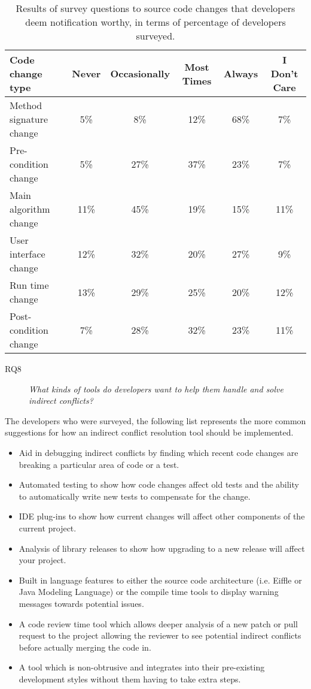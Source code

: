 \documentclass[conference]{IEEEtran}
\begin{document}
\begin{table*}[tb!]
\begin{center}
\begin{tabular}{| p{7cm} | c | c | c | c | c |}
\hline
Code change type &Never  & Occasionally & Most Times & Always & I Don't Care \\
\hline
\hline
Method signature change & 5\% & 8\% & 12\% & 68\% & 7\% \\ \hline
Pre-condition change & 5\% & 27\% & 37\% & 23\% & 7\% \\ \hline
Main algorithm change & 11\% & 45\% & 19\% & 15\% & 11\% \\ \hline
User interface change & 12\% & 32\% & 20\% & 27\% & 9\% \\ \hline
Run time change & 13\% & 29\% & 25\% & 20\% & 12\% \\ \hline
Post-condition change & 7\% & 28\% & 32\% & 23\% & 11\% \\ \hline
\end{tabular}
\end{center}
\caption{Results of survey questions to source code changes that developers deem notification worthy, in terms of percentage
of developers surveyed.\label{tab:pre}}
\end{table*}

\begin{description}
	\item[RQ8] \textit{What kinds of tools do developers want to help them handle and solve indirect conflicts?}
\end{description}

The developers who were surveyed, the following list represents the more common suggestions for how an indirect conflict
resolution tool should be implemented.

\begin{itemize}
	\item Aid in debugging indirect conflicts by finding which recent code changes are breaking a particular area of code or a test.
	\item Automated testing to show how code changes affect old tests and the ability to automatically write new tests to compensate for the change.
	\item IDE plug-ins to show how current changes will affect other components of the current project.
	\item Analysis of library releases to show how upgrading to a new release will affect your project.
	\item Built in language features to either the source code architecture (i.e. Eiffle or Java Modeling Language) or the compile time tools to display
				warning messages towards potential issues.
	\item A code review time tool which allows deeper analysis of a new patch or pull request to the project allowing the reviewer to see potential 
				indirect conflicts before actually merging the code in.
	\item A tool which is non-obtrusive and integrates into their pre-existing development styles without them having to take extra steps.
\end{itemize}
\end{document}

